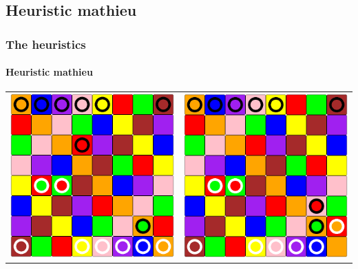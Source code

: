 \documentclass[a4paper, 11pt]{beamer}
\begin{document}
\subsection{Heuristic mathieu}
\begin{frame}
 \frametitle{The heuristics}
 \framesubtitle{Heuristic mathieu}
 \begin{table}[htbp]
  \centering
  \begin{tabular}{c c}
    \includegraphics[scale = 0.11]{mathieu_2.png} & \includegraphics[scale = 0.11]{mathieu_3.png} \\

\end{tabular}
\end{table}
\end{frame}
\end{document}
